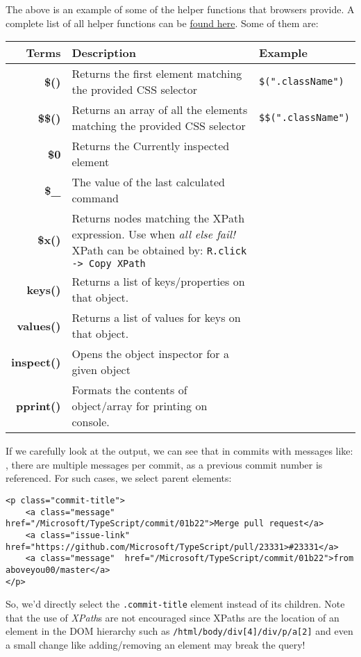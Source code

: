 \noindent
The above is an example of some of the helper functions that browsers provide. A complete list of all helper functions can be \href{https://developers.google.com/web/tools/chrome-devtools/console/command-line-reference}{found here}. Some of them are:

\noindent
\begin{tabular}{rM{0.55}M{0.25}}
\toprule
\textbf{Terms} &\textbf{Description} &\textbf{Example}\\
\midrule
\textbf{\$()}	&Returns the first element matching the provided CSS selector &\verb|$(".className")|\\
\textbf{\$\$()}	&Returns an array of all the elements matching the provided CSS selector &\verb|$$(".className")|\\
\textbf{\$0}	&Returns the Currently inspected element\\
\textbf{\$\_}	&The value of the last calculated command\\
\textbf{\$x()}	&Returns nodes matching the XPath expression. Use when \textit{all else fail!} XPath can be obtained by: \verb|R.click -> Copy XPath|\\
\textbf{keys()}	&Returns a list of keys/properties on that object.\\
\textbf{values()}	&Returns a list of values for keys on that object.\\
\textbf{inspect()}	&Opens the object inspector for a given object\\
\textbf{pprint()}	&Formats the contents of object/array for printing on console. \\
\bottomrule
\end{tabular}

If we carefully look at the output, we can see that in commits with messages like: \verb||, there are multiple messages per commit, as a previous commit number is referenced. For such cases, we select parent elements:

\vspace{-15pt}
\begin{verbatim}
<p class="commit-title">
	<a class="message"  href="/Microsoft/TypeScript/commit/01b22">Merge pull request</a> 
	<a class="issue-link"  href="https://github.com/Microsoft/TypeScript/pull/23331>#23331</a>
	<a class="message"  href="/Microsoft/TypeScript/commit/01b22">from aboveyou00/master</a>
</p>
\end{verbatim}
\vspace{-10pt}	

\noindent
So, we'd directly select the \verb|.commit-title| element instead of its children. Note that the use of \textit{XPath}s are not encouraged since XPaths are the location of an element in the DOM hierarchy such as \verb|/html/body/div[4]/div/p/a[2]| and even a small change like adding/removing an element may break the query!

